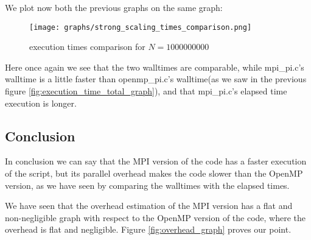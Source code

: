 \documentclass{article}
\begin{document}
We plot now both the previous graphs on the same graph:
\begin{figure}[H] %
	\centering
	\texttt{[image: graphs/strong\_scaling\_times\_comparison.png]} %
	\caption{execution times comparison for $N=1000000000$}
\end{figure}
Here once again we see that the two walltimes are comparable, while mpi\_pi.c's walltime is a little faster than openmp\_pi.c's walltime(as we saw in the previous figure \ref{fig:execution_time_total_graph}), and that mpi\_pi.c's elapsed time execution is longer. 
\subsection{Conclusion}
In conclusion we can say that the MPI version of the code has a faster execution of the script, but its parallel overhead makes the code slower than the OpenMP version, as we have seen by comparing the walltimes with the elapsed times. 

 We have seen that the overhead estimation of the MPI version has a flat and non-negligible graph  with respect to the OpenMP version of the code, where the overhead is flat and negligible. Figure \ref{fig:overhead_graph} proves our point.






\end{document}
